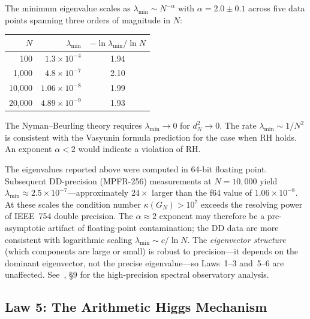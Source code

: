 \documentclass[11pt,a4paper]{article}
\begin{document}
\begin{observation}
\label{obs:lambda}
The minimum eigenvalue scales as $\lambda_{\min} \sim N^{-\alpha}$ with
$\alpha = 2.0 \pm 0.1$ across five data points spanning three orders
of magnitude in $N$:
\begin{center}
\begin{tabular}{@{}rrc@{}}
\toprule
$N$ & $\lambda_{\min}$ & $-\ln\lambda_{\min} / \ln N$ \\
\midrule
100     & $1.3 \times 10^{-4}$  & 1.94 \\
1{,}000    & $4.8 \times 10^{-7}$  & 2.10 \\
10{,}000   & $1.06 \times 10^{-8}$ & 1.99 \\
20{,}000   & $4.89 \times 10^{-9}$ & 1.93 \\
\bottomrule
\end{tabular}
\end{center}
\end{observation}

The Nyman--Beurling theory requires $\lambda_{\min} \to 0$ for
$d_N^2 \to 0$. The rate $\lambda_{\min} \sim 1/N^2$ is consistent
with the Vasyunin formula prediction for the case when RH holds.
An exponent $\alpha < 2$ would indicate a violation of RH.

\begin{remark}
The eigenvalues reported above were computed in 64-bit floating point.
Subsequent DD-precision (MPFR-256) measurements at $N = 10{,}000$
yield $\lambda_{\min} \approx 2.5 \times 10^{-7}$---approximately $24\times$
larger than the f64 value of $1.06 \times 10^{-8}$.
At these scales the condition number $\kappa(G_N) > 10^7$
exceeds the resolving power of IEEE~754 double precision.
The $\alpha \approx 2$ exponent may therefore be a pre-asymptotic
artifact of floating-point contamination; the DD data are more
consistent with logarithmic scaling $\lambda_{\min} \sim c/\ln N$.
The \emph{eigenvector structure} (which components are large or small)
is robust to precision---it depends on the dominant eigenvector,
not the precise eigenvalue---so Laws~1--3 and~5--6 are unaffected.
See~\cite{cathedral-physics}, \S9 for the high-precision spectral
observatory analysis.
\end{remark}

\subsection{Law 5: The Arithmetic Higgs Mechanism}
\end{document}
